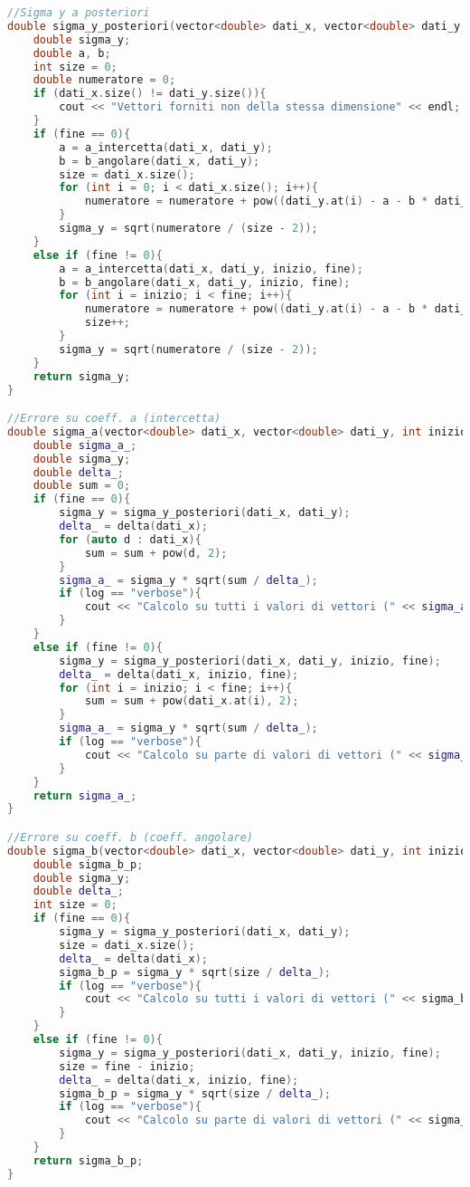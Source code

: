 \documentclass[a4paper,11pt,oneside]{article}
\begin{document}
\begin{lstlisting}[language=C++, label=lst:statistica.h, caption=statistica.h]
//Sigma y a posteriori
double sigma_y_posteriori(vector<double> dati_x, vector<double> dati_y, int inizio = 0, int fine = 0, string log = ""){
    double sigma_y;
    double a, b;
    int size = 0;
    double numeratore = 0;
    if (dati_x.size() != dati_y.size()){
        cout << "Vettori forniti non della stessa dimensione" << endl;
    }
    if (fine == 0){
        a = a_intercetta(dati_x, dati_y);
        b = b_angolare(dati_x, dati_y);
        size = dati_x.size();
        for (int i = 0; i < dati_x.size(); i++){
            numeratore = numeratore + pow((dati_y.at(i) - a - b * dati_x.at(i)), 2);
        }
        sigma_y = sqrt(numeratore / (size - 2));
    }
    else if (fine != 0){
        a = a_intercetta(dati_x, dati_y, inizio, fine);
        b = b_angolare(dati_x, dati_y, inizio, fine);
        for (int i = inizio; i < fine; i++){
            numeratore = numeratore + pow((dati_y.at(i) - a - b * dati_x.at(i)), 2);
            size++;
        }
        sigma_y = sqrt(numeratore / (size - 2));
    }
    return sigma_y;
}

//Errore su coeff. a (intercetta)
double sigma_a(vector<double> dati_x, vector<double> dati_y, int inizio = 0, int fine = 0, string log = ""){
    double sigma_a_;
    double sigma_y;
    double delta_;
    double sum = 0;
    if (fine == 0){
        sigma_y = sigma_y_posteriori(dati_x, dati_y);
        delta_ = delta(dati_x);
        for (auto d : dati_x){
            sum = sum + pow(d, 2);
        }
        sigma_a_ = sigma_y * sqrt(sum / delta_);
        if (log == "verbose"){
            cout << "Calcolo su tutti i valori di vettori (" << sigma_a_ << ")" << endl;
        }
    }
    else if (fine != 0){
        sigma_y = sigma_y_posteriori(dati_x, dati_y, inizio, fine);
        delta_ = delta(dati_x, inizio, fine);
        for (int i = inizio; i < fine; i++){
            sum = sum + pow(dati_x.at(i), 2);
        }
        sigma_a_ = sigma_y * sqrt(sum / delta_);
        if (log == "verbose"){
            cout << "Calcolo su parte di valori di vettori (" << sigma_a_ << ")" << endl;
        }
    }
    return sigma_a_;
}

//Errore su coeff. b (coeff. angolare)
double sigma_b(vector<double> dati_x, vector<double> dati_y, int inizio = 0, int fine = 0, string log = ""){
    double sigma_b_p;
    double sigma_y;
    double delta_;
    int size = 0;
    if (fine == 0){
        sigma_y = sigma_y_posteriori(dati_x, dati_y);
        size = dati_x.size();
        delta_ = delta(dati_x);
        sigma_b_p = sigma_y * sqrt(size / delta_);
        if (log == "verbose"){
            cout << "Calcolo su tutti i valori di vettori (" << sigma_b_p << ")" << endl;
        }
    }
    else if (fine != 0){
        sigma_y = sigma_y_posteriori(dati_x, dati_y, inizio, fine);
        size = fine - inizio;
        delta_ = delta(dati_x, inizio, fine);
        sigma_b_p = sigma_y * sqrt(size / delta_);
        if (log == "verbose"){
            cout << "Calcolo su parte di valori di vettori (" << sigma_b_p << ")" << endl;
        }
    }
    return sigma_b_p;
}


\end{lstlisting}
\end{document}
